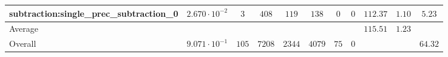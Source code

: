 \begin{tabular}{|l|c|c|c|c|c|c|c|c|c|c|}
subtraction:single\_prec\_subtraction\_0         & $ 2.670 \cdot 10^{-2} $ & $ 3      $ & $ 408  $ & $ 119  $ & $ 138   $ & $ 0  $ & $ 0 $ & $ 112.37      $ & $ 1.10    $ & $ 5.23    $ \\
\hline
Average                                          & $                     $ & $        $ & $      $ & $      $ & $       $ & $    $ & $   $ & $ 115.51      $ & $ 1.23    $ & $         $ \\
\hline
Overall                                          & $ 9.071 \cdot 10^{-1} $ & $ 105    $ & $ 7208 $ & $ 2344 $ & $ 4079  $ & $ 75 $ & $ 0 $ & $             $ & $         $ & $ 64.32   $ \\
\hline
\end{tabular}
